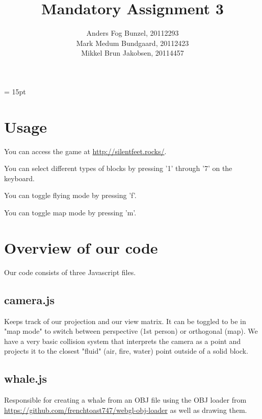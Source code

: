\documentclass[12pt,leqno]{article}
\begin{document}
\title{Mandatory Assignment 3} 
\author{Anders Fog Bunzel, 20112293\\ Mark Medum Bundgaard, 20112423\\Mikkel Brun Jakobsen, 20114457}

\maketitle

\headheight = 15pt
\thispagestyle{fancy} 
\pagestyle{fancy} \lhead{
\date{\today}}   

\section{Usage}

You can access the game at \url{http://silentfeet.rocks/}.

You can select different types of blocks by pressing '1' through '7' on the keyboard.

You can toggle flying mode by pressing 'f'.

You can toggle map mode by pressing 'm'.

\section{Overview of our code}
Our code consists of three Javascript files.

\subsection{camera.js}
Keeps track of our projection and our view matrix. It can be toggled to be in "map mode" to switch between perspective (1st person) or orthogonal (map).
We have a very basic collision system that interprets the camera as a point and projects it to the closest "fluid" (air, fire, water) point outside of a solid block.

\subsection{whale.js}
Responsible for creating a whale from an OBJ file using the OBJ loader from \url{https://github.com/frenchtoast747/webgl-obj-loader} as well as drawing them.
\end{document}
